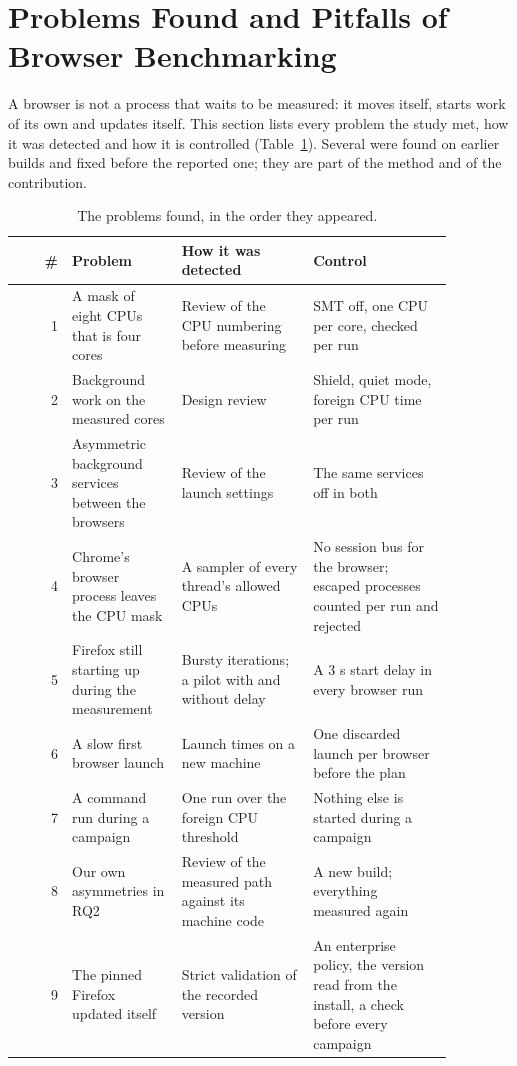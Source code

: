 \section{Problems Found and Pitfalls of Browser Benchmarking}
\label{sec:problems}

A browser is not a process that waits to be measured: it moves itself,
starts work of its own and updates itself. This section lists every problem
the study met, how it was detected and how it is controlled
(Table~\ref{tab:problems}). Several were
found on earlier builds and fixed before the reported one; they are part of
the method and of the contribution.

\begin{table}[htbp]
\caption{The problems found, in the order they appeared.}
\label{tab:problems}
\centering\scriptsize
\begin{tabular}{rp{0.25\linewidth}p{0.3\linewidth}p{0.32\linewidth}}
\toprule
\# & Problem & How it was detected & Control \\
\midrule
1 & A mask of eight CPUs that is four cores & Review of the CPU numbering before measuring & SMT off, one CPU per core, checked per run \\
2 & Background work on the measured cores & Design review & Shield, quiet mode, foreign CPU time per run \\
3 & Asymmetric background services between the browsers & Review of the launch settings & The same services off in both \\
4 & Chrome's browser process leaves the CPU mask & A sampler of every thread's allowed CPUs & No session bus for the browser; escaped processes counted per run and rejected \\
5 & Firefox still starting up during the measurement & Bursty iterations; a pilot with and without delay & A 3 s start delay in every browser run \\
6 & A slow first browser launch & Launch times on a new machine & One discarded launch per browser before the plan \\
7 & A command run during a campaign & One run over the foreign CPU threshold & Nothing else is started during a campaign \\
8 & Our own asymmetries in RQ2 & Review of the measured path against its machine code & A new build; everything measured again \\
9 & The pinned Firefox updated itself & Strict validation of the recorded version & An enterprise policy, the version read from the install, a check before every campaign \\

\end{tabular}
\end{table}
